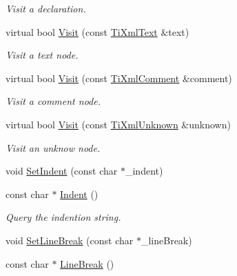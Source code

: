 \begin{DoxyCompactItemize}
\begin{DoxyCompactList}\small\item\em \-Visit a declaration. \end{DoxyCompactList}\item 
\hypertarget{classTiXmlPrinter_a0857c5d32c59b9a257f9a49cb9411df5}{
virtual bool \hyperlink{classTiXmlPrinter_a0857c5d32c59b9a257f9a49cb9411df5}{\-Visit} (const \hyperlink{classTiXmlText}{\-Ti\-Xml\-Text} \&text)}
\label{d4/d3c/classTiXmlPrinter_a0857c5d32c59b9a257f9a49cb9411df5}

\begin{DoxyCompactList}\small\item\em \-Visit a text node. \end{DoxyCompactList}\item 
\hypertarget{classTiXmlPrinter_a9870423f5603630e6142f6bdb66dfb57}{
virtual bool \hyperlink{classTiXmlPrinter_a9870423f5603630e6142f6bdb66dfb57}{\-Visit} (const \hyperlink{classTiXmlComment}{\-Ti\-Xml\-Comment} \&comment)}
\label{d4/d3c/classTiXmlPrinter_a9870423f5603630e6142f6bdb66dfb57}

\begin{DoxyCompactList}\small\item\em \-Visit a comment node. \end{DoxyCompactList}\item 
\hypertarget{classTiXmlPrinter_a08591a15c9a07afa83c24e08b03d6358}{
virtual bool \hyperlink{classTiXmlPrinter_a08591a15c9a07afa83c24e08b03d6358}{\-Visit} (const \hyperlink{classTiXmlUnknown}{\-Ti\-Xml\-Unknown} \&unknown)}
\label{d4/d3c/classTiXmlPrinter_a08591a15c9a07afa83c24e08b03d6358}

\begin{DoxyCompactList}\small\item\em \-Visit an unknow node. \end{DoxyCompactList}\item 
void \hyperlink{classTiXmlPrinter_a213377a4070c7e625bae59716b089e5e}{\-Set\-Indent} (const char $\ast$\-\_\-indent)
\item 
\hypertarget{classTiXmlPrinter_abb33ec7d4bad6aaeb57f4304394b133d}{
const char $\ast$ \hyperlink{classTiXmlPrinter_abb33ec7d4bad6aaeb57f4304394b133d}{\-Indent} ()}
\label{d4/d3c/classTiXmlPrinter_abb33ec7d4bad6aaeb57f4304394b133d}

\begin{DoxyCompactList}\small\item\em \-Query the indention string. \end{DoxyCompactList}\item 
void \hyperlink{classTiXmlPrinter_a4be1e37e69e3858c59635aa947174fe6}{\-Set\-Line\-Break} (const char $\ast$\-\_\-line\-Break)
\item 
\hypertarget{classTiXmlPrinter_a11f1b4804a460b175ec244eb5724d96d}{
const char $\ast$ \hyperlink{classTiXmlPrinter_a11f1b4804a460b175ec244eb5724d96d}{\-Line\-Break} ()}
\label{d4/d3c/classTiXmlPrinter_a11f1b4804a460b175ec244eb5724d96d}


\end{DoxyCompactItemize}
